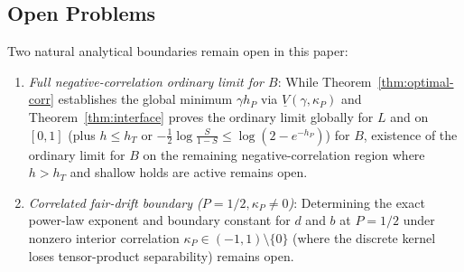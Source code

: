 \documentclass[11pt,reqno]{amsart}
\theoremstyle{definition}
\theoremstyle{remark}
\begin{document}
\subsection*{Open Problems}
Two natural analytical boundaries remain open in this paper:
\begin{enumerate}
  \item \emph{Full negative-correlation ordinary limit for $B$}: While Theorem~\ref{thm:optimal-corr} establishes the global minimum $\gamma h_P$ via $\underline{V}(\gamma,\kappa_P)$ and Theorem~\ref{thm:interface} proves the ordinary limit globally for $L$ and on $[0,1]$ (plus $h \le h_T$ or $-\frac{1}{2}\log\frac{S}{1-S} \le \log(2-e^{-h_P})$) for $B$, existence of the ordinary limit for $B$ on the remaining negative-correlation region where $h > h_T$ and shallow holds are active remains open.
  \item \emph{Correlated fair-drift boundary ($P = 1/2, \kappa_P \neq 0$)}: Determining the exact power-law exponent and boundary constant for $d$ and $b$ at $P = 1/2$ under nonzero interior correlation $\kappa_P \in (-1, 1) \setminus \{0\}$ (where the discrete kernel loses tensor-product separability) remains open.
\end{enumerate}
\end{document}
